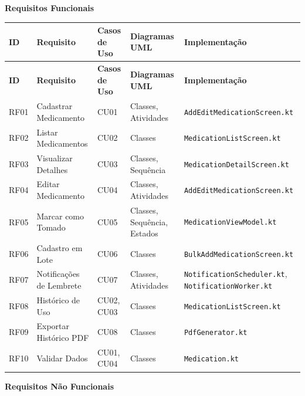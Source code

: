 \documentclass[12pt]{article}
\begin{document}
\textbf{Requisitos Funcionais}

\begin{longtable}{|p{2cm}|p{4cm}|p{3cm}|p{3cm}|p{4cm}|}
\hline
\textbf{ID} & \textbf{Requisito} & \textbf{Casos de Uso} & \textbf{Diagramas UML} & \textbf{Implementação} \\
\hline
\endfirsthead
\hline
\textbf{ID} & \textbf{Requisito} & \textbf{Casos de Uso} & \textbf{Diagramas UML} & \textbf{Implementação} \\
\hline
\endhead
RF01 & Cadastrar Medicamento & CU01 & Classes, Atividades & \texttt{AddEditMedicationScreen.kt} \\
\hline
RF02 & Listar Medicamentos & CU02 & Classes & \texttt{MedicationListScreen.kt} \\
\hline
RF03 & Visualizar Detalhes & CU03 & Classes, Sequência & \texttt{MedicationDetailScreen.kt} \\
\hline
RF04 & Editar Medicamento & CU04 & Classes, Atividades & \texttt{AddEditMedicationScreen.kt} \\
\hline
RF05 & Marcar como Tomado & CU05 & Classes, Sequência, Estados & \texttt{MedicationViewModel.kt} \\
\hline
RF06 & Cadastro em Lote & CU06 & Classes & \texttt{BulkAddMedicationScreen.kt} \\
\hline
RF07 & Notificações de Lembrete & CU07 & Classes, Atividades & \texttt{NotificationScheduler.kt}, \texttt{NotificationWorker.kt} \\
\hline
RF08 & Histórico de Uso & CU02, CU03 & Classes & \texttt{MedicationListScreen.kt} \\
\hline
RF09 & Exportar Histórico PDF & CU08 & Classes & \texttt{PdfGenerator.kt} \\
\hline
RF10 & Validar Dados & CU01, CU04 & Classes & \texttt{Medication.kt} \\
\hline
\end{longtable}

\textbf{Requisitos Não Funcionais}
\end{document}
